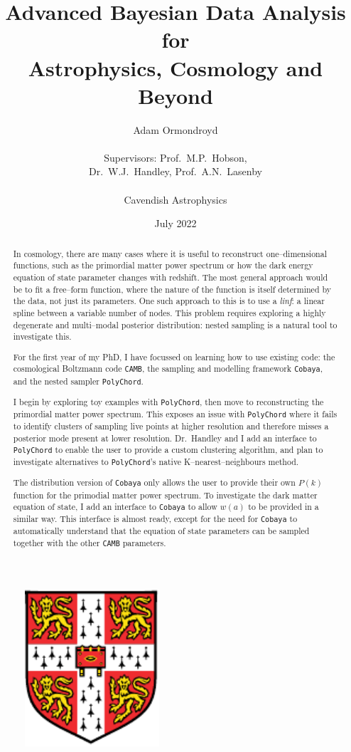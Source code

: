 \documentclass{article}
\title{Advanced Bayesian Data Analysis for \\ Astrophysics, Cosmology and Beyond}
\author{Adam Ormondroyd\\ \\Supervisors: Prof.~M.P.~Hobson, \\ Dr.~W.J.~Handley, Prof.~A.N.~Lasenby\\ \\Cavendish Astrophysics}
\date{July 2022}
\begin{document}
\setcounter{page}{0}
\maketitle

\begin{figure}[!h]
  \centering
  \includegraphics[width=5cm]{University_Crest.pdf}
  \label{fig:crest}
\end{figure}

\begin{abstract}

In cosmology, there are many cases where it is useful to reconstruct one--dimensional functions, such as the primordial matter power spectrum or how the dark energy equation of state parameter changes with redshift. The most general approach would be to fit a free--form function, where the nature of the function is itself determined by the data, not just its parameters. One such approach to this is to use a \textit{linf}: a linear spline between a variable number of nodes. This problem requires exploring a highly degenerate and multi--modal posterior distribution: nested sampling is a natural tool to investigate this.

For the first year of my PhD, I have focussed on learning how to use existing code: the cosmological Boltzmann code \texttt{CAMB}, the sampling and modelling framework \texttt{Cobaya}, and the nested sampler \texttt{PolyChord}.

I begin by exploring toy examples with \texttt{PolyChord}, then move to reconstructing the primordial matter power spectrum. This exposes an issue with \texttt{PolyChord} where it fails to identify clusters of sampling live points at higher resolution and therefore misses a posterior mode present at lower resolution. Dr.~Handley and I add an interface to \texttt{PolyChord} to enable the user to provide a custom clustering algorithm, and plan to investigate alternatives to \texttt{PolyChord}'s native K--nearest--neighbours method.

The distribution version of \texttt{Cobaya} only allows the user to provide their own $P(k)$ function for the primodial matter power spectrum. To investigate the dark matter equation of state, I add an interface to \texttt{Cobaya} to allow $w(a)$ to be provided in a similar way. This interface is almost ready, except for the need for \texttt{Cobaya} to automatically understand that the equation of state parameters can be sampled together with the other \texttt{CAMB} parameters.
\end{abstract}
\end{document}
